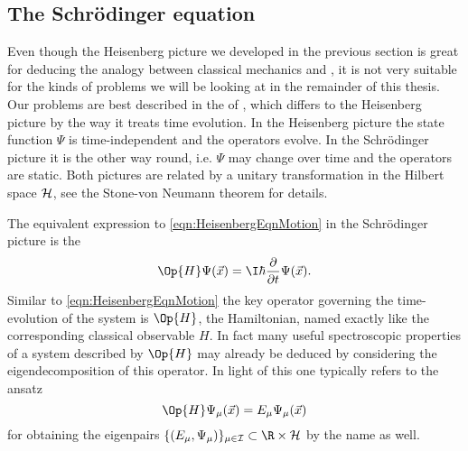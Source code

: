 \subsection{The Schrödinger equation}
Even though the Heisenberg picture we developed
in the previous section is great for deducing the analogy between
classical mechanics and \QM,
it is not very suitable for the kinds of problems we will be looking
at in the remainder of this thesis.
Our problems are best described in the  of \QM,
which differs to the Heisenberg picture by the way it treats time evolution.
In the Heisenberg picture the state function $\Psi$ is time-independent
and the operators evolve.
In the Schrödinger picture it is the other way round, i.e. $\Psi$ may change over time
and the operators are static.
Both pictures are related by a unitary transformation
in the Hilbert space $\mathcal{H}$,
see the Stone-von Neumann theorem for details.

The equivalent expression to \eqref{eqn:HeisenbergEqnMotion}
in the Schrödinger picture is the 
\begin{equation}
	\Op{H} \Psi(\vec{x}) = \I \hbar \frac{\partial}{\partial t} \Psi(\vec{x}).
	\label{eqn:TDSE}
\end{equation}
Similar to \eqref{eqn:HeisenbergEqnMotion} the key operator governing the
time-evolution of the system is $\Op{H}$, the \QM Hamiltonian,
named exactly like the corresponding classical observable $H$.
In fact many useful spectroscopic properties of a system described by $\Op{H}$
may already be deduced by considering the eigendecomposition of this operator.
In light of this one typically refers to the ansatz
\begin{equation}
	\Op{H} \Psi_\mu(\vec{x}) = E_\mu \Psi_\mu(\vec{x})
	\label{eqn:TISE}
\end{equation}
for obtaining the eigenpairs
$\{(E_\mu, \Psi_\mu) \}_{\mu \in \mathcal{I}} \subset \R \times \hilbert$
by the name  as well.


